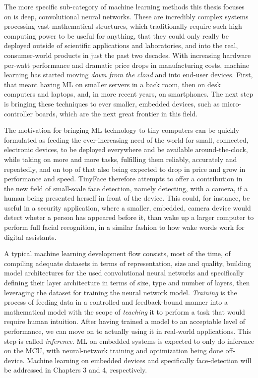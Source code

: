 The more specific sub-category of machine learning methods this thesis focuses on is deep, convolutional neural networks. These are incredibly complex systems processing vast mathematical structures, which traditionally require such high computing power to be useful for anything, that they could only really be deployed outside of scientific applications and laboratories, and into the real, consumer-world products in just the past two decades. With increasing hardware per-watt performance and dramatic price drops in manufacturing costs, machine learning has started moving \textit{down from the cloud} and into end-user devices. First, that meant having ML on smaller servers in a back room, then on desk computers and laptops, and, in more recent years, on smartphones. The next step is bringing these techniques to ever smaller, embedded devices, such as micro-controller boards, which are the next great frontier in this field. \par
The motivation for bringing ML technology to tiny computers can be quickly formulated as feeding the ever-increasing need of the world for small, connected, electronic devices, to be deployed everywhere and be available around-the-clock, while taking on more and more tasks, fulfilling them reliably, accurately and repeatedly, and on top of that also being expected to drop in price and grow in performance and speed. TinyFace therefore attempts to offer a contribution in the new field of small-scale face detection, namely detecting, with a camera, if a human being presented herself in front of the device. This could, for instance, be useful in a security application, where a smaller, embedded, camera device would detect wheter a person has appeared before it, than wake up a larger computer to perform full facial recognition, in a similar fashion to how wake words work for digital assistants. \par
A typical machine learning development flow consists, most of the time, of compiling adequate datasets in terms of representation, size and quality, building model architectures for the used convolutional neural networks and specifically defining their layer architecture in terms of size, type and number of layers, then leveraging the dataset for training the neural network model. \textit{Training} is the process of feeding data in a controlled and feedback-bound manner into a mathematical model with the scope of \textit{teaching} it to perform a task that would require human intuition. After having trained a model to an acceptable level of performance, we can move on to actually using it in real-world applications. This step is called \textit{inference}. ML on embedded systems is expected to only do inference on the MCU, with neural-network training and optimization being done off-device. Machine learning on embedded devices and specifically face-detection will be addressed in Chapters 3 and 4, respectively. \par
